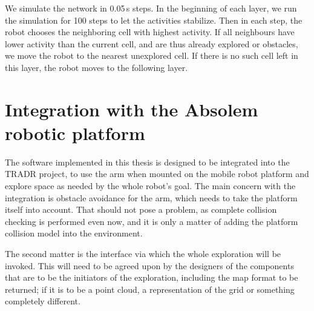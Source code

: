 \documentclass[buriama8_dp.tex]{subfiles}
\begin{document}
We simulate the network in 0.05\,s steps. In the beginning of each layer, we run the simulation for 100 steps to let the activities stabilize. Then in each step, the robot chooses the neighboring cell with highest activity. If all neighbours have lower activity than the current cell, and are thus already explored or obstacles, we move the robot to the nearest unexplored cell. If there is no such cell left in this layer, the robot moves to the following layer.

\section{Integration with the Absolem robotic platform}
\label{sec:integr}

The software implemented in this thesis is designed to be integrated into the TRADR project, to use the arm when mounted on the mobile robot platform and explore space as needed by the whole robot's goal. The main concern with the integration is obstacle avoidance for the arm, which needs to take the platform itself into account. That should not pose a problem, as complete collision checking is performed even now, and it is only a matter of adding the platform collision model into the environment.

The second matter is the interface via which the whole exploration will be invoked. This will need to be agreed upon by the designers of the components that are to be the initiators of the exploration, including the map format to be returned; if it is to be a point cloud, a representation of the grid or something completely different. 
\end{document}
